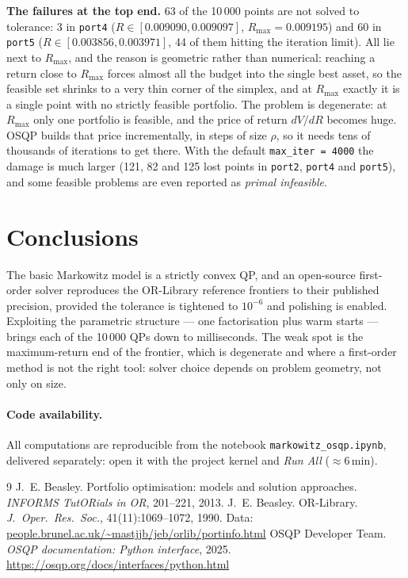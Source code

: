 \documentclass[10pt,a4paper]{article}
\begin{document}
\textbf{The failures at the top end.} 63 of the 10\,000 points are not solved to tolerance: 3 in
\texttt{port4} ($R\in[0.009090,0.009097]$, $R_{\max}=0.009195$) and 60 in \texttt{port5}
($R\in[0.003856,0.003971]$, 44 of them hitting the iteration limit). All lie next to $R_{\max}$, and the
reason is geometric rather than numerical: reaching a return close to $R_{\max}$ forces almost all the
budget into the single best asset, so the feasible set shrinks to a very thin corner of the simplex,
and at $R_{\max}$ exactly it is a single point with no strictly feasible portfolio. 
The problem is degenerate: at $R_{\max}$ only one portfolio is feasible, and the price of return
$dV/dR$ becomes huge. OSQP builds that price incrementally, in steps of size $\rho$, so it needs tens
of thousands of iterations to get there. With the default \texttt{max\_iter = 4000} the damage is much
larger (121, 82 and 125 lost points in \texttt{port2}, \texttt{port4} and \texttt{port5}), and some
feasible problems are even reported as \emph{primal infeasible}.
\vspace{-2pt}
\section{Conclusions}

The basic Markowitz model is a strictly convex QP, and an open-source first-order solver reproduces
the OR-Library reference frontiers to their published precision, provided the tolerance is tightened
to $10^{-6}$ and polishing is enabled. Exploiting the parametric structure --- one factorisation plus
warm starts --- brings each of the 10\,000 QPs down to milliseconds. The weak spot is the
maximum-return end of the frontier, which is degenerate and where a first-order method is not the right
tool: solver choice depends on problem geometry, not only on size.

\paragraph{Code availability.} All computations are reproducible from the notebook
\texttt{markowitz\_osqp.ipynb}, delivered separately: open it with the project kernel and \emph{Run
All} ($\approx6$\,min).

\begin{thebibliography}{9}
\footnotesize\setlength{\itemsep}{0pt}\setlength{\parskip}{0pt}
 J.~E. Beasley. Portfolio optimisation: models and solution approaches. \emph{INFORMS TutORials in OR}, 201--221, 2013.
 J.~E. Beasley. OR-Library. \emph{J.\ Oper.\ Res.\ Soc.}, 41(11):1069--1072, 1990. Data: \url{people.brunel.ac.uk/~mastjjb/jeb/orlib/portinfo.html}
 OSQP Developer Team. \emph{OSQP documentation: Python interface}, 2025. \url{https://osqp.org/docs/interfaces/python.html}
\end{thebibliography}
\end{document}
